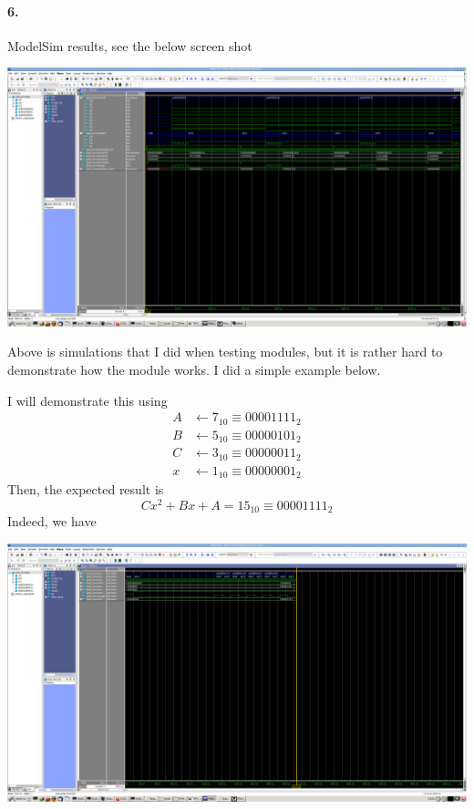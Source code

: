 \documentclass{article}
\begin{document}
\paragraph{6.} ModelSim results, see the below screen shot
\begin{center}
    \includegraphics[scale=0.19]{q2_sim.png}
\end{center}

\begin{Large}
    Above is simulations that I did when testing modules, but it is rather hard to demonstrate how the module works. I did a simple example below. \newline \newline
\end{Large}

I will demonstrate this using 
\begin{align*}
    A &\gets 7_{10} \equiv 00001111_2 \\
    B &\gets 5_{10} \equiv 00000101_2 \\
    C &\gets 3_{10} \equiv 00000011_2 \\
    x &\gets 1_{10} \equiv 00000001_2
\end{align*}
Then, the expected result is
\begin{equation*}
    Cx^2 + Bx + A = 15_{10} \equiv 00001111_2
\end{equation*}
Indeed, we have
\begin{center}
    \includegraphics[scale=0.19]{q2_simple_demo.png}
\end{center}
\end{document}
